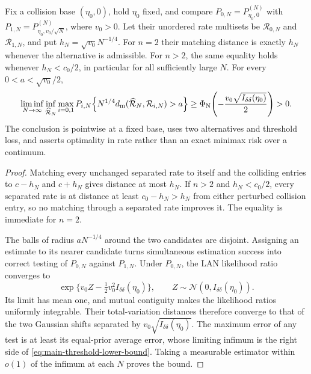 \begin{lemma}
\label{lem:two-point-threshold-rate-main}
Fix a collision base \((\eta_0,0)\), hold \(\eta_0\) fixed, and compare
\(P_{0,N}=P_{\eta_0,0}^{(N)}\) with
\(P_{1,N}=P_{\eta_0,v_0/\sqrt N}^{(N)}\), where \(v_0>0\).  Let their
unordered rate multisets be \(\mathcal R_{0,N}\) and \(\mathcal R_{1,N}\),
and put \(h_N=\sqrt{v_0}N^{-1/4}\).  For \(n=2\) their matching distance is
exactly \(h_N\) whenever the alternative is admissible.  For \(n>2\), the
same equality holds whenever \(h_N<c_0/2\), in particular for all sufficiently
large \(N\).  For every \(0<a<\sqrt{v_0}/2\),
\begin{equation}
 \liminf_{N\to\infty}\inf_{\widehat{\mathcal R}_N}
 \max_{i=0,1}P_{i,N}\!\left\{
 N^{1/4}d_{\rm m}(\widehat{\mathcal R}_N,\mathcal R_{i,N})>a
 \right\}
 \ge \Phi_{\rm N}\!\left(
 -\frac{v_0\sqrt{I_{\delta\delta}(\eta_0)}}2\right)>0.
\label{eq:main-threshold-lower-bound}
\end{equation}
The conclusion is pointwise at a fixed base, uses two alternatives and
threshold loss, and asserts optimality in rate rather than an exact minimax
risk over a continuum.
\end{lemma}

\begin{proof}
Matching every unchanged separated rate to itself and the colliding entries to
\(c-h_N\) and \(c+h_N\) gives distance at most \(h_N\).  If \(n>2\) and
\(h_N<c_0/2\), every separated rate is at distance at least
\(c_0-h_N>h_N\) from either perturbed collision entry, so no matching through
a separated rate improves it.  The equality is immediate for \(n=2\).

The balls of radius \(aN^{-1/4}\) around the two candidates are disjoint.
Assigning an estimate to its nearer candidate turns simultaneous estimation
success into correct testing of \(P_{0,N}\) against \(P_{1,N}\).  Under
\(P_{0,N}\), the LAN likelihood ratio converges to
\begin{equation}
 \exp\{v_0Z-\tfrac12v_0^2I_{\delta\delta}(\eta_0)\},
 \qquad Z\sim\mathcal N(0,I_{\delta\delta}(\eta_0)).
\label{eq:main-gaussian-likelihood-limit}
\end{equation}
Its limit has mean one, and mutual contiguity makes the likelihood ratios
uniformly integrable.  Their total-variation distances therefore converge to
that of the two Gaussian shifts separated by
\(v_0\sqrt{I_{\delta\delta}(\eta_0)}\).  The maximum error of any test is at
least its equal-prior average error, whose limiting infimum is the right side
of \eqref{eq:main-threshold-lower-bound}.  Taking a measurable estimator within \(o(1)\) of the
infimum at each \(N\) proves the bound.
\end{proof}
